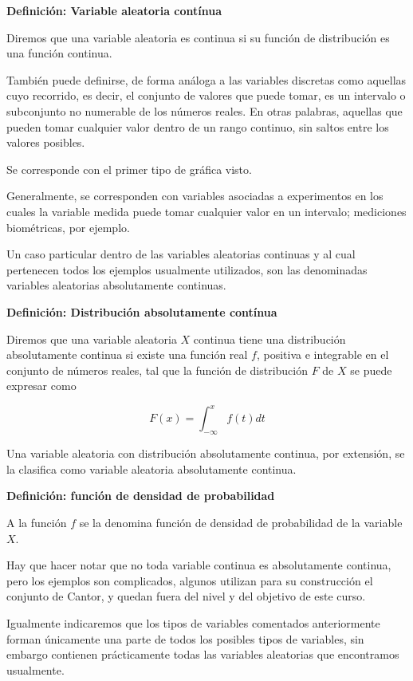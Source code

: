 \documentclass[
]{article}
\begin{document}
\textbf{Definición: Variable aleatoria contínua}

Diremos que una variable aleatoria es continua si su función de distribución es una función
continua.

También puede definirse, de forma análoga a las variables discretas como aquellas cuyo recorrido, es decir, el conjunto de valores que puede tomar, es un intervalo o subconjunto no numerable de los números reales. En otras palabras, aquellas que pueden tomar cualquier valor dentro de un rango continuo, sin saltos entre los valores posibles.

Se corresponde con el primer tipo de gráfica visto.

Generalmente, se corresponden con variables asociadas a experimentos en
los cuales la variable medida puede tomar cualquier valor en un
intervalo; mediciones biométricas, por ejemplo.

Un caso particular dentro de las variables aleatorias continuas y al
cual pertenecen todos los ejemplos usualmente utilizados, son las
denominadas variables aleatorias absolutamente continuas.

\textbf{Definición: Distribución absolutamente contínua}

Diremos que una variable aleatoria \(X\) continua tiene una distribución
absolutamente continua si existe una función real \(f\), positiva e integrable en el conjunto de números reales, tal que la función de
distribución \(F\) de \(X\) se puede expresar como

\[
F(x)=\int_{-\infty}^{x} f(t) d t
\]

Una variable aleatoria con distribución absolutamente continua, por
extensión, se la clasifica como variable aleatoria absolutamente
continua.

\textbf{Definición: función de densidad de probabilidad}

A la función \(f\) se la denomina función de densidad de probabilidad de
la variable \(X\).

Hay que hacer notar que no toda variable continua es absolutamente
continua, pero los ejemplos son complicados, algunos utilizan para su
construcción el conjunto de Cantor, y quedan fuera del nivel y del
objetivo de este curso.

Igualmente indicaremos que los tipos de variables comentados
anteriormente forman únicamente una parte de todos los posibles tipos de
variables, sin embargo contienen prácticamente todas las variables
aleatorias que encontramos usualmente.
\end{document}

